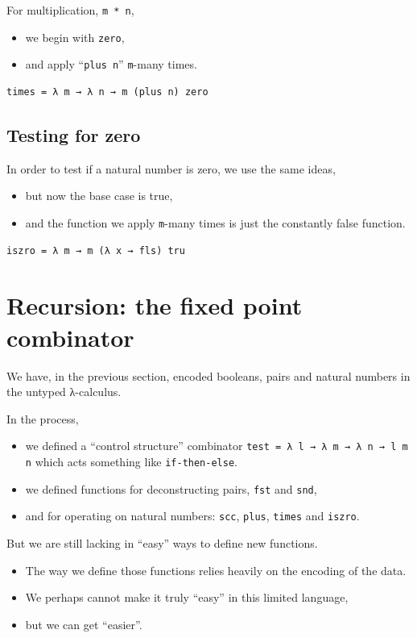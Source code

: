 \documentclass[11pt]{article}
\theoremstyle{definition}
\begin{document}
For multiplication, \texttt{m * n},
\begin{itemize}
\item we begin with \texttt{zero},
\item and apply “\texttt{plus n}” \texttt{m}-many times.
\end{itemize}
\begin{verbatim}
times = λ m → λ n → m (plus n) zero
\end{verbatim}

\subsection{Testing for zero}
\label{sec:org3091d94}

In order to test if a natural number is zero, we use the same ideas,
\begin{itemize}
\item but now the base case is true,
\item and the function we apply \texttt{m}-many times
is just the constantly false function.
\end{itemize}
\begin{verbatim}
iszro = λ m → m (λ x → fls) tru
\end{verbatim}

\section{Recursion: the fixed point combinator}
\label{sec:org4f37327}



We have, in the previous section, encoded booleans, pairs
and natural numbers in the untyped λ-calculus.

In the process,
\begin{itemize}
\item we defined a “control structure”
combinator \texttt{test = λ l → λ m → λ n → l m n}
which acts something like \texttt{if-then-else}.
\item we defined functions for deconstructing pairs, \texttt{fst} and \texttt{snd},
\item and for operating on
natural numbers: \texttt{scc}, \texttt{plus}, \texttt{times} and \texttt{iszro}.
\end{itemize}

But we are still lacking in “easy” ways to define new functions.
\begin{itemize}
\item The way we define those functions relies heavily on
the encoding of the data.
\item We perhaps cannot make it truly “easy” in this limited language,
\item but we can get “easier”.
\end{itemize}
\end{document}
